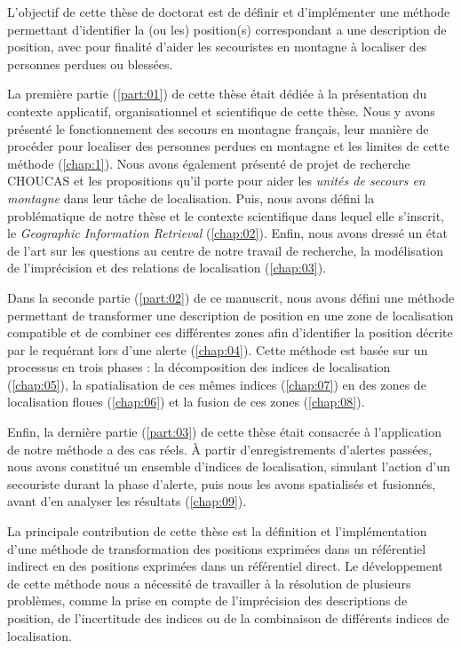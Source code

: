
L'objectif de cette thèse de doctorat est de définir et d'implémenter
une méthode permettant d'identifier la (ou les) position(s)
correspondant a une description de position, avec pour finalité
d'aider les secouristes en montagne à localiser des personnes perdues
ou blessées.

La première partie (\ref{part:01}) de cette thèse était dédiée à la
présentation du contexte applicatif, organisationnel et scientifique
de cette thèse. Nous y avons présenté le fonctionnement des secours en
montagne français, leur manière de procéder pour localiser des
personnes perdues en montagne et les limites de cette méthode
(\autoref{chap:1}). Nous avons également présenté de projet de
recherche CHOUCAS et les propositions qu'il porte pour aider les
\emph{unités de secours en montagne} dans leur tâche de
localisation. Puis, nous avons défini la problématique de notre thèse
et le contexte scientifique dans lequel elle s'inscrit, le
\emph{Geographic Information Retrieval} (\autoref{chap:02}). Enfin,
nous avons dressé un état de l'art sur les questions au centre de
notre travail de recherche, la modélisation de l'imprécision et des
relations de localisation (\autoref{chap:03}).

Dans la seconde partie (\ref{part:02}) de ce manuscrit, nous avons
défini une méthode permettant de transformer une description de
position en une zone de localisation compatible et de combiner ces
différentes zones afin d’identifier la position décrite par le
requérant lors d'une alerte (\autoref{chap:04}). Cette méthode est
basée sur un processus en trois phases : la décomposition des indices
de localisation (\autoref{chap:05}), la spatialisation de ces mêmes
indices (\autoref{chap:07}) en des zones de localisation floues
(\autoref{chap:06}) et la fusion de ces zones (\autoref{chap:08}).

Enfin, la dernière partie (\ref{part:03}) de cette thèse était
consacrée à l’application de notre méthode a des cas réels. À partir
d'enregistrements d'alertes passées, nous avons constitué un ensemble
d'indices de localisation, simulant l'action d'un secouriste durant la
phase d'alerte, puis nous les avons spatialisés et fusionnés, avant
d'en analyser les résultats (\autoref{chap:09}).


La principale contribution de cette thèse est la définition et
l'implémentation d'une méthode de transformation des positions
exprimées dans un référentiel indirect en des positions exprimées dans
un référentiel direct.
%
Le développement de cette méthode nous a nécessité de travailler à la
résolution de plusieurs problèmes, comme la prise en compte de
l'imprécision des descriptions de position, de l'incertitude des
indices ou de la combinaison de différents indices de localisation.

